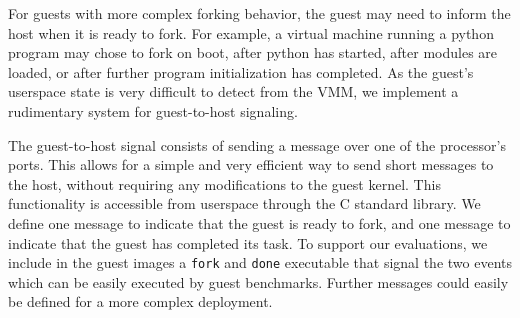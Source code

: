 For guests with more complex forking behavior, the guest may need to inform the
host when it is ready to fork. For example, a virtual machine running a python
program may chose to fork on boot, after python has started, after modules are
loaded, or after further program initialization has completed. As the guest's
userspace state is very difficult to detect from the VMM, we implement a
rudimentary system for guest-to-host signaling.

The guest-to-host signal consists of sending a message over one of the
processor's ports. This allows for a simple and very efficient way to send
short messages to the host, without requiring any modifications to the guest
kernel. This functionality is accessible from userspace through the C standard
library. We define one message to indicate that the guest is ready to fork, and
one message to indicate that the guest has completed its task. To support our
evaluations, we include in the guest images a \texttt{fork} and \texttt{done}
executable that signal the two events which can be easily executed by guest
benchmarks. Further messages could easily be defined for a more complex
deployment.
